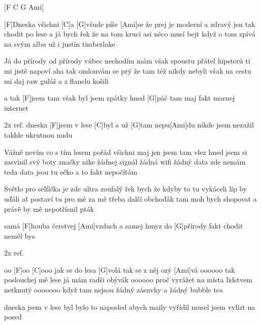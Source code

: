 
[F C G Ami]

[F]Dneska všichni [C] a [G]všude píše [Ami]se
že prej je moderní a zdravý jen tak chodit po lese
a já bych řek že na tom kruci asi něco musí bejt
když o tom zpívá na svým albu už i justin timberlake

Já do přírody od přírody vůbec nechodím
mám však spoustu přátel hipsterů ti mi jistě napoví
aha tak omlouvám se prý že tam též nikdy nebyli
však na cestu mi daj raw guláš a z flanelu košili

a tak [F] jsem tam však byl jsem zpátky hned
[G]páč tam maj fakt marnej internet

2x ref. dneska [F]jsem v lese [C]byl
a už [G]tam nepu[Ami]du
nikde jsem nezažil takhle ukrutnou nudu

\slpc
Vážně nevím co s tím lesem pořád všichni maj
jen jsem tam vlez hned jsem si zasvinil svý boty značky nike
žádnej signál žádná wifi žádný data zde nemám
teda data jsou tu ečko a to fakt nepočítám

Světlo pro selfíčka je zde ultra zoufalý
řek bych že kdyby to tu vykáceli líp by uďáli
ať postaví tu pro mě za mě třeba další obchoďák
tam moh bych shopovat a právě by mě nepotřísnil pták

samá [F]houba čerstvej [Ami]vzduch a samej hmyz
do [G]přírody fakt chodit neměl bys

2x ref.

oo [F]oo [C]ooo jak se do lesa [G]volá tak se z něj ozý [Ami]vá
oooooo tak poslouchej mě lese já mám radši obývák
oooooo proč vyrážet na místa lidstvem netknutý
ooooooo když tam nejsou žádný zásuvky a žádný bubble tea

dneska jsem v lese byl
bylo to naposled
abych maily vyřídil
musel jsem vylízt na posed



